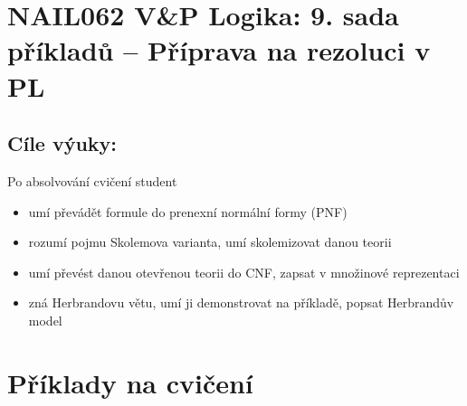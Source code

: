 \section*{NAIL062 V\&P Logika: 9. sada příkladů -- Příprava na rezoluci v PL}


\subsection*{Cíle výuky:} Po absolvování cvičení student

    \begin{itemize}\setlength{\itemsep}{0pt}
        \item umí převádět formule do prenexní normální formy (PNF)
        \item rozumí pojmu Skolemova varianta, umí skolemizovat danou teorii
        \item umí převést danou otevřenou teorii do CNF, zapsat v množinové reprezentaci
        \item zná Herbrandovu větu, umí ji demonstrovat na příkladě, popsat Herbrandův model
    \end{itemize}
    

\section*{Příklady na cvičení}


